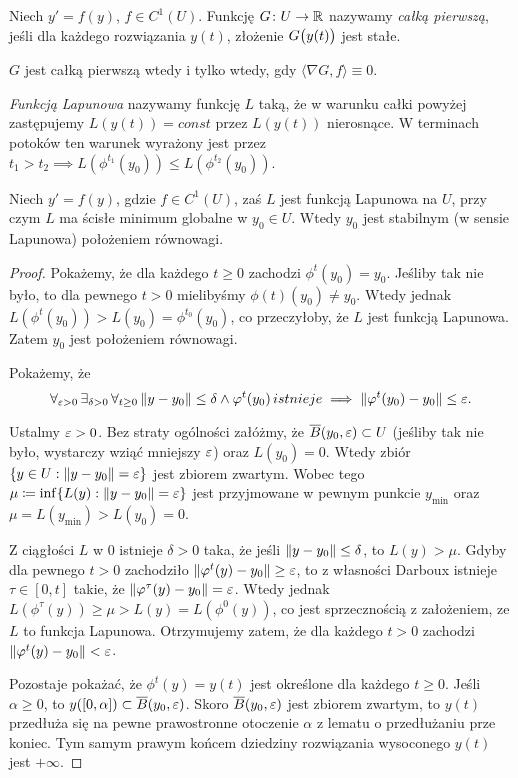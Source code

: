%
\begin{definition}
  Niech $y' = f(y)$, $f \in C^1(U)$. Funkcję $G \colon U \to \R$ nazywamy \emph{całką pierwszą}, jeśli dla każdego 
  rozwiązania $y(t)$, złożenie $G \p[\big]{y(t)}$ jest stałe.
\end{definition}
%
\begin{lemma}
  $G$ jest całką pierwszą wtedy i tylko wtedy, gdy $\langle \nabla G, f \rangle \equiv 0$.
\end{lemma}
%
\begin{definition}
	\emph{Funkcją Lapunowa} nazywamy funkcję $L$ taką, że w warunku całki powyżej zastępujemy
	$L(y(t)) = const$ przez $L(y(t))$ nierosnące. W terminach potoków ten warunek wyrażony jest przez 
	$t_1 > t_2 \implies L(\phi^{t_1}(y_0)) \le L(\phi^{t_2}(y_0))$.
\end{definition}
%
\begin{theorem}
	Niech $y' = f(y)$, gdzie $f \in C^1(U)$, zaś $L$ jest funkcją Lapunowa na $U$, przy czym $L$ ma ścisłe minimum
	globalne w $y_0 \in U$. Wtedy $y_0$ jest stabilnym (w sensie Lapunowa) położeniem równowagi.
\end{theorem}
%
\begin{proof}
	Pokażemy, że dla każdego $t \ge 0$ zachodzi $\phi^t(y_0) = y_0$. Jeśliby tak nie było, to dla pewnego $t > 0$
	mielibyśmy $\phi(t)(y_0) \ne y_0$. Wtedy jednak $L(\phi^t(y_0)) > L(y_0) = \phi^{t_0}(y_0)$, co przeczyłoby, że
	$L$ jest funkcją Lapunowa. Zatem $y_0$ jest położeniem równowagi.
	
	Pokażemy, że
	\begin{equation*}
	\forall_{\eps > 0} \, \exists_{\delta > 0} \, \forall_{t \ge 0} \, \norm{ y - y_0} \le \delta \land \phi^t(y_0) \,  istnieje  \implies \norm{ \phi^t( y_0 ) - y_0 } \le \eps .
	\end{equation*}
	
	Ustalmy $\eps > 0$. Bez straty ogólności załóżmy, że $\overline{B}(y_0, \eps) \subset U$ (jeśliby tak nie było, wystarczy 
	wziąć mniejszy $\eps$) oraz $L(y_0) = 0$. Wtedy zbiór $\{ y \in U : \norm{ y - y_0 } = \eps \}$ jest zbiorem zwartym.
	Wobec tego $\mu \coloneqq \inf\{ L(y) : \norm{ y - y_0 } = \eps \}$ jest przyjmowane w pewnym punkcie $y_{\min}$ oraz
	$\mu = L(y_{\min}) > L(y_0) = 0$.
	
	Z ciągłości $L$ w 0 istnieje $\delta > 0$ taka, że jeśli $\norm{ y - y_0 } \le \delta$, to $L(y) > \mu$. Gdyby dla pewnego 
	$t > 0$ zachodziło $\norm{ \phi^t(y) - y_0 } \ge \eps$, to z własności Darboux istnieje $\tau \in [0, t]$ takie, że 
	$\norm{ \phi^\tau(y) - y_0 } = \eps$. Wtedy jednak $L(\phi^\tau(y)) \ge \mu > L(y) = L(\phi^0(y))$, co jest sprzecznością
	z założeniem, ze $L$ to funkcja Lapunowa. Otrzymujemy zatem, że dla każdego $t>0$ zachodzi $\norm{ \phi^t(y) - y_0 } < \eps$.
	
	Pozostaje pokażać, że $\phi^t(y) = y(t)$ jest określone dla każdego $t \ge 0$. Jeśli $\alpha \ge 0$, to $y([0, \alpha]) \subset \overline{B}(y_0, \eps)$. Skoro $\overline{B}(y_0, \eps)$ jest zbiorem zwartym, to $y(t)$ przedłuża się na pewne
	prawostronne otoczenie $\alpha$ z lematu o przedłużaniu prze koniec. Tym samym prawym końcem dziedziny rozwiązania
	wysoconego $y(t)$ jest $+\infty$. 
\end{proof}
%